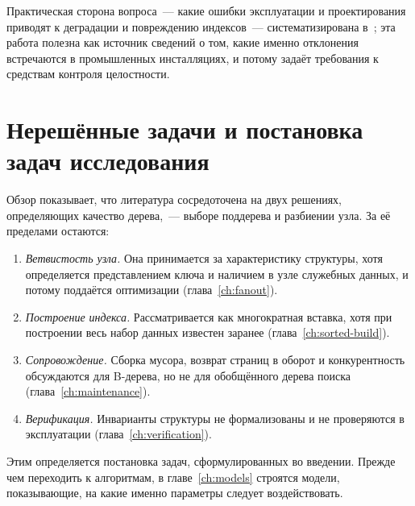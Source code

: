Практическая сторона вопроса~--- какие ошибки эксплуатации и проектирования
приводят к деградации и повреждению индексов~--- систематизирована
в~\cite{angelakos2025}; эта работа полезна как источник сведений о том, какие
именно отклонения встречаются в промышленных инсталляциях, и потому задаёт
требования к средствам контроля целостности.

\section{Нерешённые задачи и постановка задач исследования}

Обзор показывает, что литература сосредоточена на двух решениях, определяющих
качество дерева,~--- выборе поддерева и разбиении узла. За её пределами
остаются:

\begin{enumerate}
\item \emph{Ветвистость узла.} Она принимается за характеристику структуры,
      хотя определяется представлением ключа и наличием в узле служебных
      данных, и потому поддаётся оптимизации (глава~\ref{ch:fanout}).
\item \emph{Построение индекса.} Рассматривается как многократная вставка, хотя
      при построении весь набор данных известен заранее
      (глава~\ref{ch:sorted-build}).
\item \emph{Сопровождение.} Сборка мусора, возврат страниц в оборот и
      конкурентность обсуждаются для B-дерева, но не для обобщённого дерева
      поиска (глава~\ref{ch:maintenance}).
\item \emph{Верификация.} Инварианты структуры не формализованы и не
      проверяются в эксплуатации (глава~\ref{ch:verification}).
\end{enumerate}

Этим определяется постановка задач, сформулированных во введении. Прежде чем
переходить к алгоритмам, в главе~\ref{ch:models} строятся модели, показывающие,
на какие именно параметры следует воздействовать.
